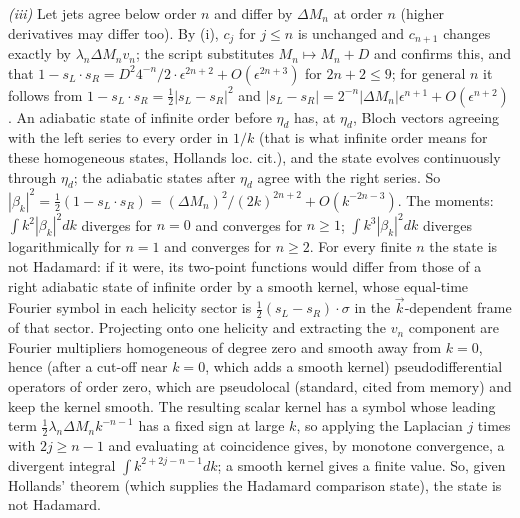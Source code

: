 \emph{(iii)} Let jets agree below order $n$ and differ by $\Delta M_{n}$ at order $n$ (higher derivatives may differ too). By (i), $c_{j}$ for $j \le n$ is unchanged and $c_{n+1}$ changes exactly by $\lambda_{n}\Delta M_{n}v_{n}$; the script substitutes $M_{n} \mapsto M_{n} + D$ and confirms this, and that $1 - s_{L}\cdot s_{R} = D^{2}4^{-n}/2\cdot\epsilon^{2n+2} + O(\epsilon^{2n+3})$ for $2n + 2 \le 9$; for general $n$ it follows from $1 - s_{L}\cdot s_{R} = \tfrac12|s_{L} - s_{R}|^{2}$ and $|s_{L} - s_{R}| = 2^{-n}|\Delta M_{n}|\epsilon^{n+1} + O(\epsilon^{n+2})$. An adiabatic state of infinite order before $\eta_{d}$ has, at $\eta_{d}$, Bloch vectors agreeing with the left series to every order in $1/k$ (that is what infinite order means for these homogeneous states, Hollands loc. cit.), and the state evolves continuously through $\eta_{d}$; the adiabatic states after $\eta_{d}$ agree with the right series. So $|\beta_{k}|^{2} = \tfrac12(1 - s_{L}\cdot s_{R}) = (\Delta M_{n})^{2}/(2k)^{2n+2} + O(k^{-2n-3})$. The moments: $\int k^{2}|\beta_{k}|^{2}dk$ diverges for $n = 0$ and converges for $n \ge 1$; $\int k^{3}|\beta_{k}|^{2}dk$ diverges logarithmically for $n = 1$ and converges for $n \ge 2$. For every finite $n$ the state is not Hadamard: if it were, its two-point functions would differ from those of a right adiabatic state of infinite order by a smooth kernel, whose equal-time Fourier symbol in each helicity sector is $\tfrac12(s_{L} - s_{R})\cdot\sigma$ in the $\vec k$-dependent frame of that sector. Projecting onto one helicity and extracting the $v_{n}$ component are Fourier multipliers homogeneous of degree zero and smooth away from $k = 0$, hence (after a cut-off near $k = 0$, which adds a smooth kernel) pseudodifferential operators of order zero, which are pseudolocal (standard, cited from memory) and keep the kernel smooth. The resulting scalar kernel has a symbol whose leading term $\tfrac12\lambda_{n}\Delta M_{n}k^{-n-1}$ has a fixed sign at large $k$, so applying the Laplacian $j$ times with $2j \ge n - 1$ and evaluating at coincidence gives, by monotone convergence, a divergent integral $\int k^{2 + 2j - n - 1}dk$; a smooth kernel gives a finite value. So, given Hollands' theorem (which supplies the Hadamard comparison state), the state is not Hadamard.

